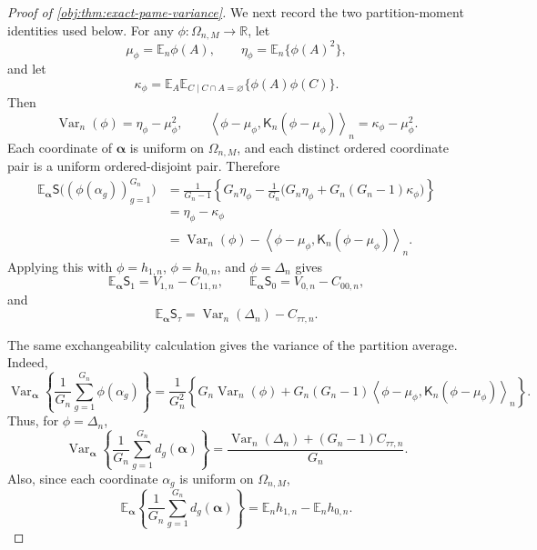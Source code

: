 \begin{proof}[Proof of \cref{obj:thm:exact-pame-variance}]
We next record the two partition-moment identities used below. For any
\(\phi:\Omega_{n,M}\to\mathbb R\), let
\[
\mu_\phi=\mathbb E_n\phi(A),\qquad
\eta_\phi=\mathbb E_n\{\phi(A)^2\},
\]
and let
\[
\kappa_\phi
=
\mathbb E_A\mathbb E_{C\mid C\cap A=\varnothing}\{\phi(A)\phi(C)\}.
\]
Then
\[
\operatorname{Var}_n(\phi)=\eta_\phi-\mu_\phi^2,
\qquad
\left\langle \phi-\mu_\phi,\mathsf K_n(\phi-\mu_\phi)\right\rangle_n
=\kappa_\phi-\mu_\phi^2 .
\]
Each coordinate of \(\boldsymbol\alpha\) is uniform on \(\Omega_{n,M}\), and each distinct ordered coordinate pair is a uniform ordered-disjoint pair. Therefore
\[
\begin{aligned}
\mathbb E_{\boldsymbol\alpha}\mathsf S\bigl((\phi(\alpha_g))_{g=1}^{G_n}\bigr)
&=
\frac{1}{G_n-1}
\left\{
G_n\eta_\phi
-\frac1{G_n}\bigl(G_n\eta_\phi+G_n(G_n-1)\kappa_\phi\bigr)
\right\} \\
&=\eta_\phi-\kappa_\phi \\
&=
\operatorname{Var}_n(\phi)
-
\left\langle \phi-\mu_\phi,\mathsf K_n(\phi-\mu_\phi)\right\rangle_n .
\end{aligned}
\]
Applying this with \(\phi=h_{1,n}\), \(\phi=h_{0,n}\), and \(\phi=\Delta_n\) gives
\[
\mathbb E_{\boldsymbol\alpha}\mathsf S_1=V_{1,n}-C_{11,n},\qquad
\mathbb E_{\boldsymbol\alpha}\mathsf S_0=V_{0,n}-C_{00,n},
\]
and
\[
\mathbb E_{\boldsymbol\alpha}\mathsf S_\tau
=
\operatorname{Var}_n(\Delta_n)-C_{\tau\tau,n}.
\]

The same exchangeability calculation gives the variance of the partition average. Indeed,
\[
\operatorname{Var}_{\boldsymbol\alpha}
\left\{
\frac1{G_n}\sum_{g=1}^{G_n}\phi(\alpha_g)
\right\}
=
\frac{1}{G_n^2}
\left\{
G_n\operatorname{Var}_n(\phi)
+
G_n(G_n-1)
\left\langle \phi-\mu_\phi,\mathsf K_n(\phi-\mu_\phi)\right\rangle_n
\right\}.
\]
Thus, for \(\phi=\Delta_n\),
\[
\operatorname{Var}_{\boldsymbol\alpha}
\left\{
\frac1{G_n}\sum_{g=1}^{G_n}d_g(\boldsymbol\alpha)
\right\}
=
\frac{\operatorname{Var}_n(\Delta_n)+(G_n-1)C_{\tau\tau,n}}{G_n}.
\]
Also, since each coordinate \(\alpha_g\) is uniform on \(\Omega_{n,M}\),
\[
\mathbb E_{\boldsymbol\alpha}
\left\{
\frac1{G_n}\sum_{g=1}^{G_n}d_g(\boldsymbol\alpha)
\right\}
=
\mathbb E_n h_{1,n}-\mathbb E_n h_{0,n}.
\]


\end{proof}
